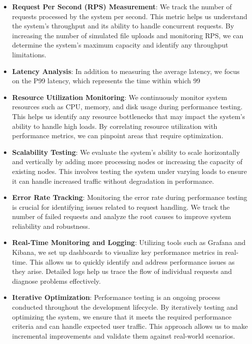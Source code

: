 \documentclass[12pt,a4paper]{report}
\begin{document}
\begin{itemize}
    \item \textbf{Request Per Second (RPS) Measurement}: We track the number of requests processed by the system per second. This metric helps us understand the system's throughput and its ability to handle concurrent requests. By increasing the number of simulated file uploads and monitoring RPS, we can determine the system's maximum capacity and identify any throughput limitations.

    \item \textbf{Latency Analysis}: In addition to measuring the average latency, we focus on the P99 latency, which represents the time within which 99%

    \item \textbf{Resource Utilization Monitoring}: We continuously monitor system resources such as CPU, memory, and disk usage during performance testing. This helps us identify any resource bottlenecks that may impact the system's ability to handle high loads. By correlating resource utilization with performance metrics, we can pinpoint areas that require optimization.

    \item \textbf{Scalability Testing}: We evaluate the system's ability to scale horizontally and vertically by adding more processing nodes or increasing the capacity of existing nodes. This involves testing the system under varying loads to ensure it can handle increased traffic without degradation in performance.

    \item \textbf{Error Rate Tracking}: Monitoring the error rate during performance testing is crucial for identifying issues related to request handling. We track the number of failed requests and analyze the root causes to improve system reliability and robustness.

    \item \textbf{Real-Time Monitoring and Logging}: Utilizing tools such as Grafana and Kibana, we set up dashboards to visualize key performance metrics in real-time. This allows us to quickly identify and address performance issues as they arise. Detailed logs help us trace the flow of individual requests and diagnose problems effectively.

    \item \textbf{Iterative Optimization}: Performance testing is an ongoing process conducted throughout the development lifecycle. By iteratively testing and optimizing the system, we ensure that it meets the required performance criteria and can handle expected user traffic. This approach allows us to make incremental improvements and validate them against real-world scenarios.
\end{itemize}
\end{document}
